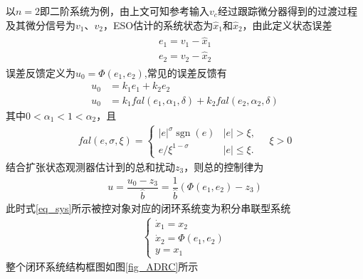 以$ n=2 $即二阶系统为例，由上文可知参考输入$ v_c $经过跟踪微分器得到的过渡过程及其微分信号为$ v_1 $、$ v_2 $，ESO估计的系统状态为$ \hat{x}_1 $和$ \hat{x}_2 $，由此定义状态误差
\begin{align}\begin{array}{l}
e_{1}=v_{1}-\hat{x}_{1} \\
e_{2}=v_{2}-\hat{x}_{2}
\end{array}\end{align}
误差反馈定义为$ u_{0}=\Phi (e_1,e_2) $,常见的误差反馈有
\begin{align}
u_{0} &=k_1 e_{1}+k_2 e_{2} \label{eq_LEF}	\\	
u_{0} &=k_{1} fal\left(e_{1}, \alpha_{1}, \delta\right)+k_{2} fal\left(e_{2}, \alpha_{2}, \delta\right)	\label{eq_NLEF}
\end{align}
其中$ 0<\alpha_{1}<1<\alpha_{2} $，且
\begin{align}
fal(e, \sigma, \xi)=
\begin{cases}
|e|^{\sigma} \operatorname{sgn}(e) &  |e|>\xi,\\
e / \xi^{1-\sigma} &  |e| \leq \xi.
\end{cases}\quad \xi >0
\end{align}
结合扩张状态观测器估计到的总和扰动$ z_{3} $，则总的控制律为
\begin{align}
u=\dfrac{u_{0}-z_{3}}{\hat{b}}=\dfrac{1}{\hat{b}}(\Phi (e_1,e_2) -z_{3})
\end{align}
此时式\eqref{eq_sys}所示被控对象对应的闭环系统变为积分串联型系统
\begin{align}\left\{\begin{array}{l}
\dot{x}_{1}=x_{2} \\
\dot{x}_{2}=\Phi(e_1,e_2) \\
y=x_{1}
\end{array}\right.\end{align}
整个闭环系统结构框图如图\ref{fig_ADRC}所示
